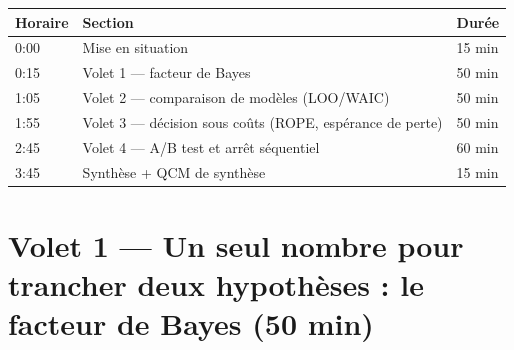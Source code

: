 \documentclass[11pt,a4paper]{article}
\begin{document}
\begin{rappel}
\begin{center}
\small
\begin{tabular}{@{}lll@{}}
\toprule
\textbf{Horaire} & \textbf{Section} & \textbf{Durée} \\
\midrule
0:00 & Mise en situation & 15 min \\
0:15 & Volet 1 --- facteur de Bayes & 50 min \\
1:05 & Volet 2 --- comparaison de modèles (LOO/WAIC) & 50 min \\
1:55 & Volet 3 --- décision sous coûts (ROPE, espérance de perte) & 50 min \\
2:45 & Volet 4 --- A/B test et arrêt séquentiel & 60 min \\
3:45 & Synthèse + QCM de synthèse & 15 min \\
\bottomrule
\end{tabular}
\end{center}
\end{rappel}

\section{Volet 1 --- Un seul nombre pour trancher deux hypothèses : le facteur de Bayes (50 min)}
\end{document}
